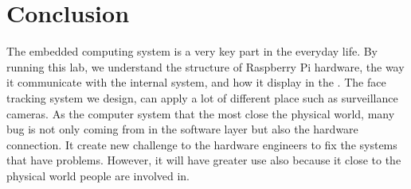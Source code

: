 \documentclass{article}
\begin{document}
\section{Conclusion}
The embedded computing system is a very key part in the everyday life. By running this lab, we understand the structure of Raspberry Pi hardware, the way it communicate with the internal system, and how it display in the .  The face tracking system we design, can apply a lot of different place such as surveillance cameras. As the computer system that the most close the physical world, many bug is not only coming from in the software layer but also the hardware connection. It create new challenge to the hardware engineers to fix the systems that have problems. However, it will have greater use also because it close to the physical world people are involved in. 
\end{document}
